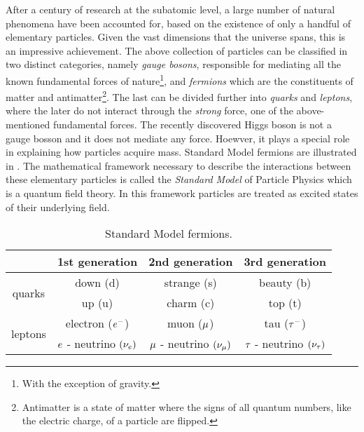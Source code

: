 After a century of research at the subatomic level, a large number of natural phenomena have been accounted
for, based on the existence of only a handful of elementary particles. Given the vast dimensions that the
universe spans, this is an impressive achievement. The above collection of particles can be classified
in two distinct categories, namely {\it gauge bosons}, responsible for mediating all the known fundamental
forces of nature\footnote{With the exception of gravity.}, and {\it fermions} which are the constituents
of matter and antimatter\footnote{Antimatter is a state of matter where the signs of all quantum numbers,
like the electric charge, of a particle are flipped.}. The last can be divided further into {\it quarks}
and {\it leptons}, where the later do not interact through the {\it strong} force, one of the above-mentioned
fundamental forces. The recently discovered Higgs boson \cite{higgs-cms,higgs-atlas} is not a gauge bosson and
it does not mediate any force. Hoewver, it plays a special role in explaining how particles acquire mass.
Standard Model fermions are illustrated in . The mathematical framework necessary to
describe the interactions between these elementary particles is called the \textit{Standard Model} of Particle
Physics \cite{sm-glashow,sm-weinberg,sm-salam} which is a quantum field theory. In this framework particles are
treated as excited states of their underlying field.


\begin{table}[h!]
  \centering
 \begin{tabular}{cccc}
   \hline
                            &  1st generation                     &   2nd generation              &  3rd generation    \\
   \hline
   \multirow{2}{*}{quarks}  &  down (d)                           &   strange (s)                 &  beauty (b)        \\
                            &  up (u)                             &   charm (c)                   &  top (t)           \\
   \hline
   \multirow{2}{*}{leptons} &   electron ($e^-$)                  &   muon ($\mu$)               &  tau ($\tau^-$)     \\
                            &   $e$ - neutrino $(\nu_e)$  &  $\mu$ - neutrino $(\nu_\mu)$  &  $\tau$ - neutrino $(\nu_\tau)$  \\
   \hline
 \end{tabular}
 \caption{Standard Model fermions.}
 \label{quarksLeptons}
\end{table}

